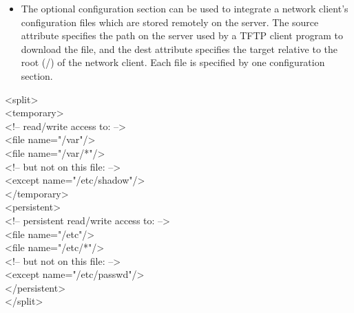 \begin {itemize}
      In this case, KIWI creates an additional write partition, then
      combines both partitions with the given overlay filesystem.
      Currently, there are two such filesystems: unionfs and aufs
      (aufs is the preferred file system). The partition that holds the
      read-only system image must be set as the ro attribute value, and the
      partition that serves as the write partition must be set the rw
      attribute value.
\item The optional configuration section can be used to integrate a network
      client's configuration files which are stored remotely on the server.
      The source attribute specifies the path on the server used by a
      TFTP client program to download the file, and the dest attribute
      specifies the target relative to the root (/) of the network client.
      Each file is specified by one configuration section.
\end{itemize}

\newpage

\begin{Command}{12cm}
<split>\\
\hspace*{1cm}<temporary>\\
\hspace*{2cm}<!-- read/write access to: -->\\
\hspace*{2cm}<file name="/var"/>\\
\hspace*{2cm}<file name="/var/*"/>\\
\hspace*{2cm}<!-- but not on this file: -->\\
\hspace*{2cm}<except name="/etc/shadow"/>\\
\hspace*{1cm}</temporary>\\
\hspace*{1cm}<persistent>\\
\hspace*{2cm}<!-- persistent read/write access to: -->\\
\hspace*{2cm}<file name="/etc"/>\\
\hspace*{2cm}<file name="/etc/*"/>\\
\hspace*{2cm}<!-- but not on this file: -->\\
\hspace*{2cm}<except name="/etc/passwd"/>\\
\hspace*{1cm}</persistent>\\
</split>
\end{Command}


